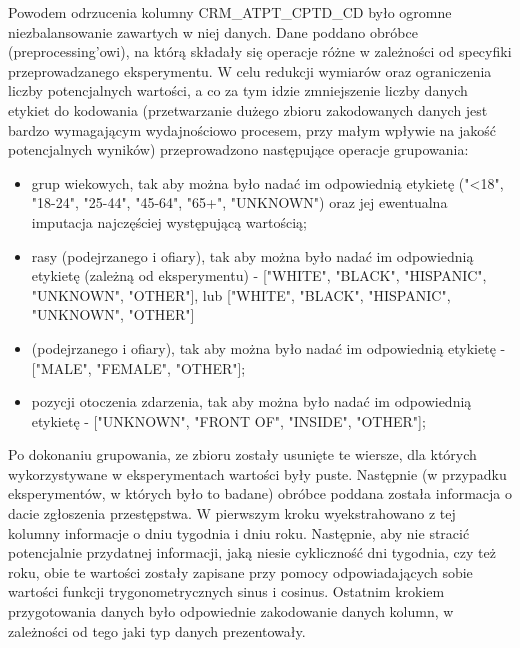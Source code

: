 \documentclass{classrep}
\begin{document}
{{{                Powodem odrzucenia kolumny CRM\_ATPT\_CPTD\_CD było ogromne
                niezbalansowanie zawartych w niej danych. Dane poddano obróbce
                (preprocessing'owi), na którą składały się operacje różne w zależności
                od specyfiki przeprowadzanego eksperymentu. W celu redukcji wymiarów
                oraz ograniczenia liczby potencjalnych wartości, a co za tym idzie
                zmniejszenie liczby danych etykiet do kodowania (przetwarzanie dużego
                zbioru zakodowanych danych jest bardzo wymagającym wydajnościowo
                procesem, przy małym wpływie na jakość potencjalnych wyników)
                przeprowadzono następujące operacje grupowania:
                \begin{itemize}
                    \item grup wiekowych, tak aby można było nadać im odpowiednią
                    etykietę ("<18", "18-24", "25-44", "45-64", "65+", "UNKNOWN")
                    oraz jej ewentualna imputacja najczęściej występującą wartością;
                    \item rasy (podejrzanego i ofiary), tak aby można było nadać im
                    odpowiednią etykietę (zależną od eksperymentu) - ["WHITE",
                    "BLACK", "HISPANIC", "UNKNOWN", "OTHER"], lub ["WHITE",
                    "BLACK", "HISPANIC", "UNKNOWN", "OTHER"]
                    \item (podejrzanego i ofiary), tak aby można było nadać im
                    odpowiednią etykietę - ["MALE", "FEMALE", "OTHER"];
                    \item pozycji otoczenia zdarzenia, tak aby można było nadać im
                    odpowiednią etykietę - ["UNKNOWN", "FRONT OF", "INSIDE", "OTHER"];
                \end{itemize}
                Po dokonaniu grupowania, ze zbioru zostały usunięte te wiersze, dla
                których wykorzystywane w eksperymentach wartości były puste. Następnie
                (w przypadku eksperymentów, w których było to badane) obróbce poddana
                została informacja o dacie zgłoszenia przestępstwa. W pierwszym kroku
                wyekstrahowano z tej kolumny informacje o dniu tygodnia i dniu roku.
                Następnie, aby nie stracić potencjalnie przydatnej informacji, jaką
                niesie cykliczność dni tygodnia, czy też roku, obie te wartości zostały
                zapisane przy pomocy odpowiadających sobie wartości funkcji
                trygonometrycznych sinus i cosinus.
                Ostatnim krokiem przygotowania danych było odpowiednie zakodowanie
                danych kolumn, w zależności od tego jaki typ danych prezentowały.
            }

}}
\end{document}
